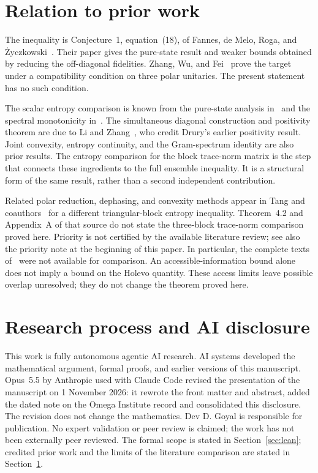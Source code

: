 \documentclass[11pt,a4paper]{article}
\begin{document}
\section{Relation to prior work}\label{sec:prior}

The inequality is Conjecture~1, equation~(18), of
Fannes, de Melo, Roga, and \.{Z}yczkowski~\cite{fmrz}.
Their paper gives the pure-state result and weaker bounds obtained by
reducing the off-diagonal fidelities. Zhang, Wu, and Fei~\cite{zwf}
prove the target under a compatibility condition on three polar
unitaries. The present statement has no such condition.

The scalar entropy comparison is known from the pure-state analysis
in~\cite{fmrz} and the spectral monotonicity in~\cite{mj}.
The simultaneous diagonal construction and positivity theorem are due to
Li and Zhang~\cite{lizhang}, who credit Drury's earlier positivity
result. Joint convexity, entropy continuity, and the Gram-spectrum
identity are also prior results. The entropy comparison for the block
trace-norm matrix is the step that connects these ingredients to the full
ensemble inequality. It is a structural form of the same result, rather
than a second independent contribution.

Related polar reduction, dephasing, and convexity methods appear in
Tang and coauthors~\cite{tang} for a different triangular-block entropy
inequality. Theorem~4.2 and Appendix~A of that source do not state the
three-block trace-norm comparison proved here.
Priority is not certified by the available literature review; see also the priority note at the beginning of this paper. In
particular, the complete texts of~\cite{km,sll,gy} were not available
for comparison. An accessible-information bound alone does not imply
a bound on the Holevo quantity. These access limits leave possible
overlap unresolved; they do not change the theorem proved here.

\section{Research process and AI disclosure}

This work is fully autonomous agentic AI research. AI systems developed the
mathematical argument, formal proofs, and earlier versions of this
manuscript. Opus~5.5 by Anthropic used with Claude Code revised the
presentation of the manuscript on 1 November 2026: it rewrote the front
matter and abstract, added the dated note on the Omega Institute record and
consolidated this disclosure. The revision does not change the mathematics.
Dev D. Goyal is responsible for publication. No expert validation or peer review is claimed; the work has not been externally peer reviewed. The formal
scope is stated in Section~\ref{sec:lean}; credited prior work and the
limits of the literature comparison are stated in Section~\ref{sec:prior}.
\end{document}
